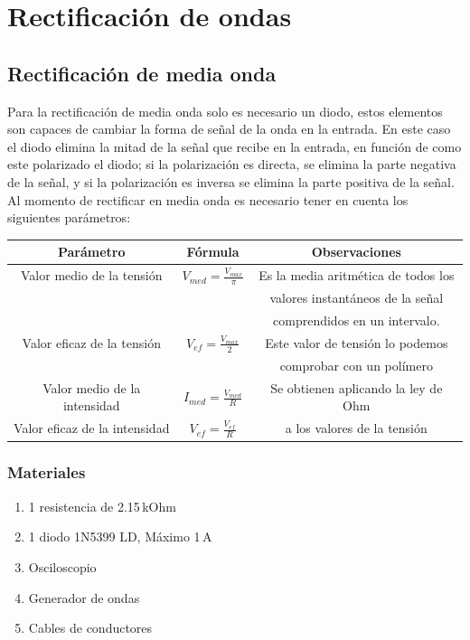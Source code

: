 \documentclass[a4paper,12pt]{report}
\begin{document}
\chapter{Rectificación de ondas}
\section{Rectificación de media onda}
Para la rectificación de media onda solo es necesario un diodo, estos elementos son capaces de cambiar la forma de señal de la onda en la entrada. En este caso el diodo elimina la mitad de la señal que recibe en la entrada, en función de como este polarizado el diodo; si la polarización es directa, se elimina la parte negativa de la señal, y si la polarización es inversa se elimina la parte positiva de la señal. Al momento de rectificar en media onda es necesario tener en cuenta los siguientes parámetros:
\begin{center}
\begin{tabular}{|c|c|c|}
\hline 
Parámetro & Fórmula & Observaciones \\ 
\hline 
Valor medio de la tensión & $\displaystyle  V_{med} = \frac{V_{max}}{\pi}$ & Es la media aritmética de todos los \\
& & valores instantáneos de la señal\\
& & comprendidos en un intervalo.\\
\hline 
Valor eficaz de la tensión & $\displaystyle  V_{ef} = \frac{V_{max}}{2}$ & Este valor de tensión lo podemos \\
& & comprobar con un polímero \\ 
\hline 
Valor medio de la intensidad & $\displaystyle I_{med} = \frac{V_{med}}{R}$ & Se obtienen aplicando la ley de Ohm \\ 
\cline{1-2} 
Valor eficaz de la intensidad & $\displaystyle V_{ef} = \frac{V_{ef}}{R}$ & a los valores de la tensión \\ 
\hline 
\end{tabular} 
\end{center}
\subsection{Materiales}
\begin{enumerate}
\item 1 resistencia de 2.15$\,$kOhm
\item 1 diodo 1N5399 LD, Máximo 1$\,$A
\item Osciloscopio
\item Generador de ondas
\item Cables de conductores
\end{enumerate}
\end{document}
